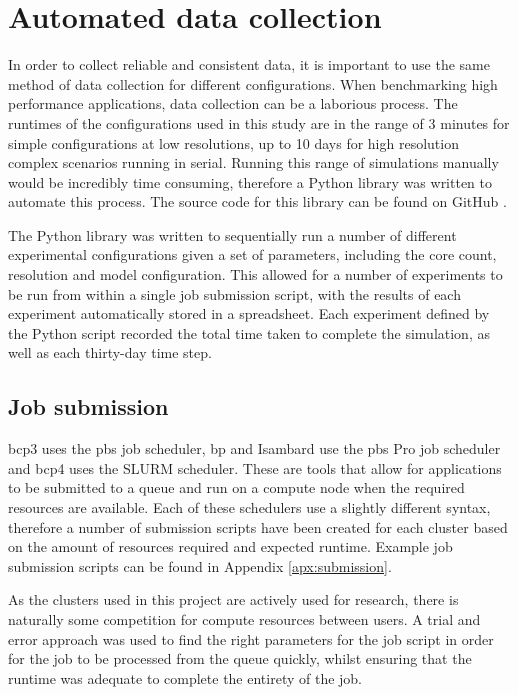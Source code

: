 \documentclass[a4paper,11pt]{report}
\begin{document}
\section{Automated data collection}
In order to collect reliable and consistent data, it is important to use the same method of data collection for different configurations. When benchmarking high performance applications, data collection can be a laborious process. The runtimes of the configurations used in this study are in the range of 3 minutes for simple configurations at low resolutions, up to 10 days for high resolution complex scenarios running in serial. Running this range of simulations manually would be incredibly time consuming, therefore a Python library was written to automate this process. The source code for this library can be found on GitHub \cite{lancaster2019github}. 
\par
The Python library was written to sequentially run a number of different experimental configurations given a set of parameters, including the core count, resolution and model configuration. This allowed for a number of experiments to be run from within a single job submission script, with the results of each experiment automatically stored in a spreadsheet. Each experiment defined by the Python script recorded the total time taken to complete the simulation, as well as each thirty-day time step. 


\subsection{Job submission}
\gls{bcp3} uses the \gls{pbs} job scheduler, \gls{bp} and Isambard use the \gls{pbs} Pro job scheduler and \gls{bcp4} uses the SLURM scheduler. These are tools that allow for applications to be submitted to a queue and run on a compute node when the required resources are available. Each of these schedulers use a slightly different syntax, therefore a number of submission scripts have been created for each cluster based on the amount of resources required and expected runtime. Example job submission scripts can be found in Appendix \ref{apx:submission}. 
\par
As the clusters used in this project are actively used for research, there is naturally some competition for compute resources between users. A trial and error approach was used to find the right parameters for the job script in order for the job to be processed from the queue quickly, whilst ensuring that the runtime was adequate to complete the entirety of the job.
\end{document}
